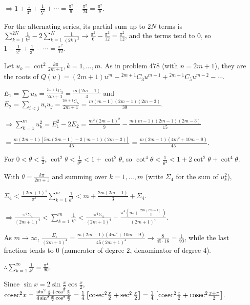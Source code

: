  $\Rightarrow 1 + \frac{1}{3^2} + \frac{1}{5^2} + \cdots = \frac{\pi^2}{6} - \frac{\pi^2}{24}
  = \frac{\pi^2}{8}$.

  For the alternating series, its partial sum up to $2N$ terms is $\displaystyle\sum_{k = 1}^{2N}\frac{1}{k^2}
  - 2\sum_{k = 1}^N\frac{1}{(2k)^2}\to\frac{\pi^2}{6} - \frac{\pi^2}{12} = \frac{\pi^2}{12}$, and the terms
  tend to $0$, so $1 - \frac{1}{2^2} + \frac{1}{3^2} - \cdots = \frac{\pi^2}{12}$.
\item Let $u_k = \cot^2\frac{k\pi}{2m + 1}, k = 1, \ldots, m$. As in problem 478 (with $n = 2m + 1$), they
  are the roots of $Q(u) = (2m + 1)u^m - {}^{2m + 1}C_3u^{m - 1} + {}^{2m + 1}C_5u^{m - 2} - \cdots$.

  $E_1 = \displaystyle\sum u_k = \frac{{}^{2m + 1}C_3}{2m + 1} = \frac{m(2m - 1)}{3}$ and $E_2
  = \displaystyle\sum_{i < j}u_iu_j = \frac{{}^{2m + 1}C_5}{2m + 1} = \frac{m(m - 1)(2m - 1)(2m - 3)}{30}$.

  $\Rightarrow\displaystyle\sum_{k = 1}^mu_k^2 = E_1^2 - 2E_2 = \frac{m^2(2m - 1)^2}{9} - \frac{m(m - 1)(2m -
    1)(2m - 3)}{15}$

  $= \frac{m(2m - 1)[5m(2m - 1) - 3(m - 1)(2m - 3)]}{45} = \frac{m(2m - 1)(4m^2 + 10m - 9)}{45}$.

  For $0 < \theta < \frac{\pi}{2}$, $\cot^2\theta < \frac{1}{\theta^2} < 1 + \cot^2\theta$, so
  $\cot^4\theta < \frac{1}{\theta^4} < 1 + 2\cot^2\theta + \cot^4\theta$.

  With $\theta = \frac{k\pi}{2m + 1}$ and summing over $k = 1, \ldots, m$ (write $\Sigma_4$ for the sum of
  $u_k^2$),

  $\Sigma_4 < \frac{(2m + 1)^4}{\pi^4}\displaystyle\sum_{k = 1}^m\frac{1}{k^4} < m + \frac{2m(2m - 1)}{3}
  + \Sigma_4$.

  $\Rightarrow\frac{\pi^4\Sigma_4}{(2m + 1)^4} < \displaystyle\sum_{k = 1}^m\frac{1}{k^4}
  < \frac{\pi^4\Sigma_4}{(2m + 1)^4} + \frac{\pi^4\left(m + \frac{2m(2m - 1)}{3}\right)}{(2m + 1)^4}$.

  As $m\to\infty$, $\frac{\Sigma_4}{(2m + 1)^4} = \frac{m(2m - 1)(4m^2 + 10m - 9)}{45(2m + 1)^4}\to\frac{8}{45\cdot
    16} = \frac{1}{90}$, while the last fraction tends to $0$ (numerator of degree $2$, denominator of degree
  $4$).

  $\therefore\displaystyle\sum_{k = 1}^\infty\frac{1}{k^4} = \frac{\pi^4}{90}$.
\item Since $\sin x = 2\sin\frac{x}{2}\cos\frac{x}{2}$, ${\rm cosec}^2x = \frac{\sin^2\frac{x}{2}
  + \cos^2\frac{x}{2}}{4\sin^2\frac{x}{2}\cos^2\frac{x}{2}} = \frac{1}{4}\left[{\rm cosec}^2\frac{x}{2} +
  \sec^2\frac{x}{2}\right] = \frac{1}{4}\left[{\rm cosec}^2\frac{x}{2} + {\rm cosec}^2\frac{x +
    \pi}{2}\right]$.


